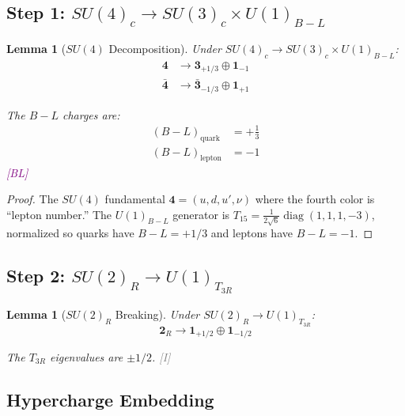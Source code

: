 \documentclass[11pt,a4paper]{article}
\newtheorem{lemma}[theorem]{Lemma}
\newcommand{\tagI}{\textcolor{gray}{[I]}}
\newcommand{\tagBL}{\textcolor{purple}{[BL]}}
\DeclareMathOperator{\diag}{diag}
\begin{document}
\subsection{Step 1: $SU(4)_c \to SU(3)_c \times U(1)_{B-L}$}

\begin{lemma}[$SU(4)$ Decomposition]
\label{lem:su4-decomp}
Under $SU(4)_c \to SU(3)_c \times U(1)_{B-L}$:
\begin{align}
\label{eq:su4-fund}
\mathbf{4} &\to \mathbf{3}_{+1/3} \oplus \mathbf{1}_{-1} \\
\label{eq:su4-antifund}
\bar{\mathbf{4}} &\to \bar{\mathbf{3}}_{-1/3} \oplus \mathbf{1}_{+1}
\end{align}

The $B-L$ charges are:
\begin{align}
\label{eq:BL-quark}
(B-L)_{\text{quark}} &= +\frac{1}{3} \\
\label{eq:BL-lepton}
(B-L)_{\text{lepton}} &= -1
\end{align}
\tagBL
\end{lemma}

\begin{proof}
The $SU(4)$ fundamental $\mathbf{4} = (u, d, u', \nu)$ where the fourth color is ``lepton number.''
The $U(1)_{B-L}$ generator is $T_{15} = \frac{1}{2\sqrt{6}}\diag(1,1,1,-3)$, normalized so
quarks have $B-L = +1/3$ and leptons have $B-L = -1$.
\end{proof}

\subsection{Step 2: $SU(2)_R \to U(1)_{T_{3R}}$}

\begin{lemma}[$SU(2)_R$ Breaking]
\label{lem:su2r-breaking}
Under $SU(2)_R \to U(1)_{T_{3R}}$:
\begin{equation}
\label{eq:su2r-doublet}
\mathbf{2}_R \to \mathbf{1}_{+1/2} \oplus \mathbf{1}_{-1/2}
\end{equation}

The $T_{3R}$ eigenvalues are $\pm 1/2$.
\tagI
\end{lemma}

\subsection{Hypercharge Embedding}
\end{document}
